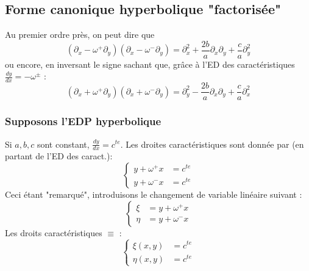 \documentclass[11pt, a4paper, openany]{book}
\begin{document}
			\subsection{Forme canonique hyperbolique "factorisée"}
			Au premier ordre près, on peut dire que
			\begin{equation}
				(\partial_x - \omega^+ \partial_y)(\partial_x - \omega^- \partial_y) = \partial_x^2 + \frac{2b}{a}\partial_x\partial_y + \frac{c}{a}\partial_y^2
			\end{equation}
			ou encore, en inversant le signe sachant que, grâce à l'ED des caractéristiques $\frac{dy}{dx} = -\omega^\pm$ :
			\begin{equation}
				(\partial_x + \omega^+ \partial_y)(\partial_x + \omega^- \partial_y) = \partial_y^2 - \frac{2b}{a}\partial_x\partial_y + \frac{c}{a}\partial_x^2
			\end{equation}
																
			\subsubsection{Supposons l'EDP hyperbolique}
			Si $a,b,c$ sont constant, $\frac{dy}{dx} = c^{te}$. Les droites caractéristiques sont donnée par (en partant de l'ED des caract.):
			\begin{equation}
				\left\{\begin{array}{ll}
				y+\omega^+x &= c^{te}\\
				y+\omega^-x &= c^{te}
				\end{array}\right.
			\end{equation}
			Ceci étant "remarqué", introduisons le changement de variable linéaire suivant :
			\begin{equation}
				\left\{\begin{array}{ll}
				\xi &= y +\omega^+x\\
				\eta &= y +\omega^-x
				\end{array}\right.
			\end{equation}
			Les droits caractéristiques $\equiv$ :
			\begin{equation}
				\left\{\begin{array}{ll}
				\xi(x,y) &= c^{te}\\
				\eta(x,y) &= c^{te}
				\end{array}\right.
			\end{equation}
			\ \\
																
\end{document}
